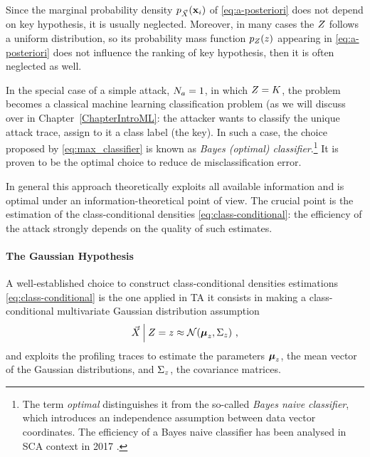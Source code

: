 \begin{remark}Since the marginal probability density $p_{\vec{X}}(\textbf{x}_{i})$ of \eqref{eq:a-posteriori} does not depend on key hypothesis, it is usually neglected. Moreover, in many cases the $Z$ follows a uniform distribution, so its probability mass function $p_{Z}(z)$ appearing in \eqref{eq:a-posteriori}  does not influence the ranking of key hypothesis, then it is often neglected as well. 
\end{remark}

\begin{remark}
In the special case of a simple attack, \ie $N_a = 1$, in which $Z = K$, the problem becomes a classical machine learning classification problem (as we will discuss over in Chapter~\ref{ChapterIntroML}: the attacker wants to classify the unique attack trace, \ie assign to it a class label (the key). In such a case, the choice proposed by \eqref{eq:max_classifier} is known as \emph{Bayes (optimal) classifier}.\footnote{The term \emph{optimal} distinguishes it from the so-called \emph{Bayes naive classifier}, which introduces an independence assumption between data vector coordinates. The efficiency of a Bayes naive classifier has been analysed in SCA context in 2017 \cite{picek2017template}.} It is proven to be the optimal choice to reduce de misclassification error.
\end{remark}

In general this approach theoretically exploits all available information and is optimal under an information-theoretical point of view. The crucial point is the estimation of the class-conditional densities \eqref{eq:class-conditional}: the efficiency of the attack strongly depends on the quality of such estimates. 

\paragraph{The Gaussian Hypothesis} A well-established choice to construct class-conditional densities estimations \ref{eq:class-conditional} is the one applied in TA \cite{Chari2003} it consists in making a class-conditional multivariate Gaussian distribution assumption
\begin{equation}\label{eq:gaussian_assumption}
\vec{X}\:\Big\vert\: Z =z \approx \mathcal{N}(\boldsymbol{\mu}_z, \Sigma_z)\mbox{ ,}
\end{equation} 
and exploits the profiling traces to estimate the  parameters $\boldsymbol{\mu}_z$, \ie the mean vector of the Gaussian distributions, and $ \Sigma_z$, \ie the covariance matrices. \\

